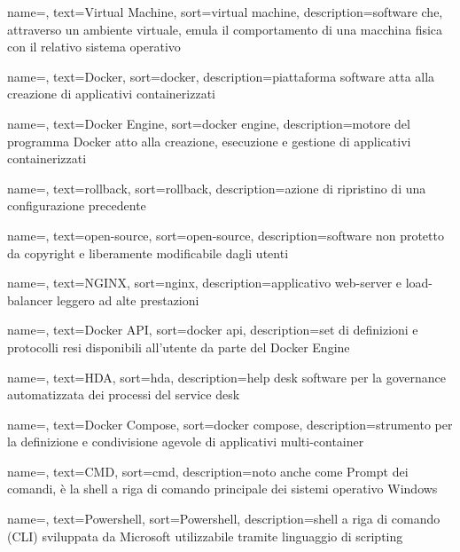 {
    name=,
    text=Virtual Machine,
    sort=virtual machine, 
    description={software che, attraverso un ambiente virtuale, emula il comportamento di una macchina fisica con il relativo sistema operativo}
}

{
    name=,
    text=Docker,
    sort=docker, 
    description={piattaforma software atta alla creazione di applicativi containerizzati}
}

{
    name=,
    text=Docker Engine,
    sort=docker engine, 
    description={motore del programma Docker atto alla creazione, esecuzione e gestione di applicativi containerizzati}
}

{
    name=,
    text=rollback,
    sort=rollback, 
    description={azione di ripristino di una configurazione precedente}
}

{
    name=,
    text=open-source,
    sort=open-source, 
    description={software non protetto da copyright e liberamente modificabile dagli utenti}
}

{
    name=,
    text=NGINX,
    sort=nginx, 
    description={applicativo web-server e load-balancer leggero ad alte prestazioni}
}

{
    name=,
    text=Docker API,
    sort=docker api, 
    description={set di definizioni e protocolli resi disponibili all'utente da parte del Docker Engine}
}

{
    name=,
    text=HDA,
    sort=hda, 
    description={help desk software per la governance automatizzata dei processi del service desk}
}

{
    name=,
    text=Docker Compose,
    sort=docker compose, 
    description={strumento per la definizione e condivisione agevole di applicativi multi-container}
}

{
    name=,
    text=CMD,
    sort=cmd, 
    description={noto anche come Prompt dei comandi, è la shell a riga di comando principale dei sistemi operativo Windows}
}

{
    name=,
    text=Powershell,
    sort=Powershell, 
    description={shell a riga di comando (CLI) sviluppata da Microsoft utilizzabile tramite linguaggio di scripting}
}

